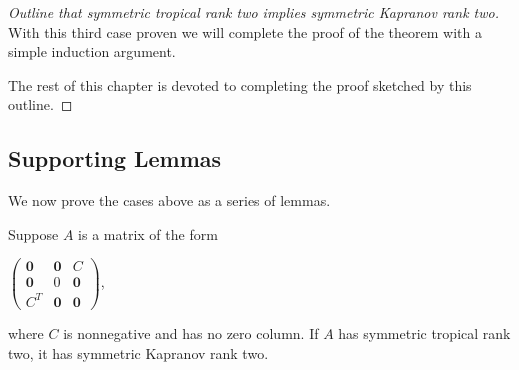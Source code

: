 \documentclass{article}
\begin{document}
\begin{proof}[Outline that symmetric tropical rank two implies symmetric Kapranov rank two]
  With this third case proven we will complete the proof of the theorem with a simple induction argument.

  The rest of this chapter is devoted to completing the proof sketched by this outline.

\end{proof}

\subsection{Supporting Lemmas}

We now prove the cases above as a series of lemmas.

\begin{lem}
  Suppose $A$ is a matrix of the form
  \begin{center}      
    $\left(\begin{array}{ccc} \textbf{0} & \textbf{0} & C \\ \textbf{0} & 0 & \textbf{0} \\ C^{T} & \textbf{0} & \textbf{0} \end{array}\right)$,
  \end{center}   
  where $C$ is nonnegative and has no zero column. If $A$ has symmetric tropical rank two, it has symmetric Kapranov rank two.
\end{lem}
\end{document}
